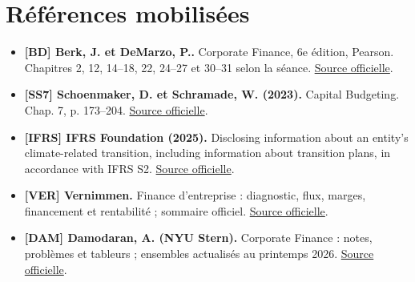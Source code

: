 \documentclass[12pt,a4paper]{article}
\begin{document}
\section*{Références mobilisées}
\small
\begin{itemize}
\item \textbf{[BD] Berk, J. et DeMarzo, P..} Corporate Finance, 6e édition, Pearson. Chapitres 2, 12, 14--18, 22, 24--27 et 30--31 selon la séance. \href{https://www.pearson.com/en-us/subject-catalog/p/corporate-finance/P200000009791/9780137844906}{Source officielle}.
\item \textbf{[SS7] Schoenmaker, D. et Schramade, W. (2023).} Capital Budgeting. Chap. 7, p. 173--204. \href{https://doi.org/10.1007/978-3-031-35009-2_7}{Source officielle}.
\item \textbf{[IFRS] IFRS Foundation (2025).} Disclosing information about an entity’s climate-related transition, including information about transition plans, in accordance with IFRS S2. \href{https://www.ifrs.org/content/dam/ifrs/supporting-implementation/ifrs-s2/transition-plan-disclosure-s2.pdf}{Source officielle}.
\item \textbf{[VER] Vernimmen.} Finance d’entreprise : diagnostic, flux, marges, financement et rentabilité ; sommaire officiel. \href{https://www.vernimmen.fr/Vernimmen/Plan_du_livre.php}{Source officielle}.
\item \textbf{[DAM] Damodaran, A. (NYU Stern).} Corporate Finance : notes, problèmes et tableurs ; ensembles actualisés au printemps 2026. \href{https://pages.stern.nyu.edu/~adamodar/New_Home_Page/cflect.htm}{Source officielle}.
\end{itemize}\normalsize
\end{document}
